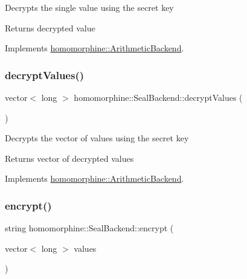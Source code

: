 Decrypts the single value using the secret key

\begin{DoxyReturn}{Returns}
decrypted value 
\end{DoxyReturn}


Implements \mbox{\hyperlink{classhomomorphine_1_1_arithmetic_backend_af4aad032c46ce51e608092ac206882bd}{homomorphine\+::\+Arithmetic\+Backend}}.

\mbox{\label{classhomomorphine_1_1_seal_backend_afa5f6cbb10d74c1911fcb88f722a0159}} 
\subsubsection{\texorpdfstring{decryptValues()}{decryptValues()}}
{\footnotesize\ttfamily vector$<$ long $>$ homomorphine\+::\+Seal\+Backend\+::decrypt\+Values (\begin{DoxyParamCaption}{ }\end{DoxyParamCaption})\hspace{0.3cm}{\ttfamily [virtual]}}

Decrypts the vector of values using the secret key

\begin{DoxyReturn}{Returns}
vector of decrypted values 
\end{DoxyReturn}


Implements \mbox{\hyperlink{classhomomorphine_1_1_arithmetic_backend_a2fb1ce64e74c4930b7d364ce3b9cc8fe}{homomorphine\+::\+Arithmetic\+Backend}}.

\mbox{\label{classhomomorphine_1_1_seal_backend_a0c9f992fb7626e55ad0bbfcc068e8e43}} 
\subsubsection{\texorpdfstring{encrypt()}{encrypt()}\hspace{0.1cm}{\footnotesize\ttfamily [1/2]}}
{\footnotesize\ttfamily string homomorphine\+::\+Seal\+Backend\+::encrypt (\begin{DoxyParamCaption}\item[{vector$<$ long $>$}]{values }\end{DoxyParamCaption})\hspace{0.3cm}{\ttfamily [virtual]}}

